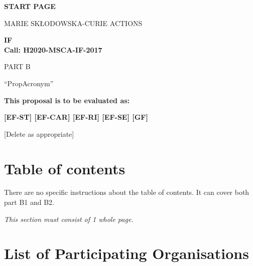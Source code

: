 
\phantom{a}
\vspace{15mm}
\begin{center}


        \Large{
      
     
        \textbf{START PAGE}
  
          \vspace{15mm}
          MARIE SK\L{}ODOWSKA-CURIE ACTIONS\\
          \vspace{1cm}
          
          \textbf{\acf{IF}}\\
          \textbf{Call: H2020-MSCA-IF-2017}
          \vspace{2cm}                   

          PART B
          \vspace{2.5cm}

          ``{\sc \ac{PropAcronym}\xspace}''
          \vspace{2cm}

          \textbf{This proposal is to be evaluated as:}
          \vspace{.5cm}

          \textbf{[EF-ST] [EF-CAR] [EF-RI] [EF-SE] [GF]}\\
        }
        \large{[Delete as appropriate]}

  \end{center}
\vspace{1cm}

\newpage
\setcounter{tocdepth}{1}
\tableofcontents


\newpage

\section*{Table of contents}
\label{sec:toc}

There are no specific instructions about the table of contents. It can cover both part B1 and B2.

\medskip\noindent
\emph{This section must consist of 1 whole page.}


\section*{List of Participating Organisations}
\label{sec:participants}

